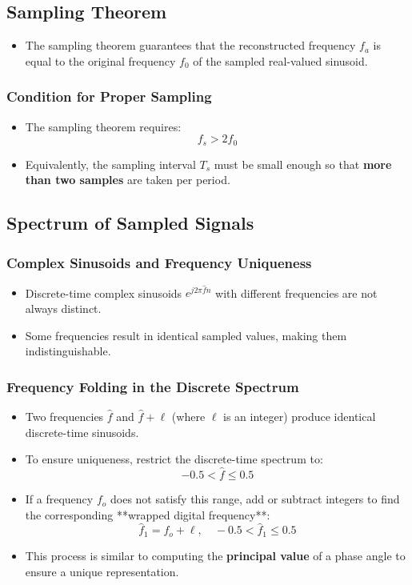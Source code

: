 \documentclass[12pt, letterpaper]{article}
\begin{document}
\subsection{Sampling Theorem}
\begin{itemize}
    \item The sampling theorem guarantees that the reconstructed frequency \( f_a \) is equal to the original frequency \( f_0 \) of the sampled real-valued sinusoid.
\end{itemize}

\subsubsection{Condition for Proper Sampling}
\begin{itemize}
    \item The sampling theorem requires:
    \[
    f_s > 2f_0
    \]
    \item Equivalently, the sampling interval \( T_s \) must be small enough so that \textbf{more than two samples} are taken per period.
\end{itemize}

\subsection{Spectrum of Sampled Signals}

\subsubsection{Complex Sinusoids and Frequency Uniqueness}
\begin{itemize}
    \item Discrete-time complex sinusoids \( e^{j 2\pi \hat{f} n} \) with different frequencies are not always distinct.
    \item Some frequencies result in identical sampled values, making them indistinguishable.
\end{itemize}

\subsubsection{Frequency Folding in the Discrete Spectrum}
\begin{itemize}
    \item Two frequencies \( \hat{f} \) and \( \hat{f} + \ell \) (where \( \ell \) is an integer) produce identical discrete-time sinusoids.
    \item To ensure uniqueness, restrict the discrete-time spectrum to:
    \[
    -0.5 < \hat{f} \leq 0.5
    \]
    \item If a frequency \( f_o \) does not satisfy this range, add or subtract integers to find the corresponding **wrapped digital frequency**:
    \[
    \hat{f}_1 = f_o + \ell, \quad -0.5 < \hat{f}_1 \leq 0.5
    \]
    \item This process is similar to computing the \textbf{principal value} of a phase angle to ensure a unique representation.
\end{itemize}
\end{document}

